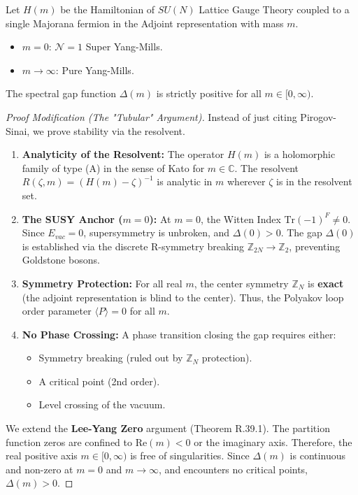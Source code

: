 \begin{definition}
Let $H(m)$ be the Hamiltonian of $SU(N)$ Lattice Gauge Theory coupled to a single Majorana fermion in the Adjoint representation with mass $m$.
\begin{itemize}
    \item $m=0$: $\mathcal{N}=1$ Super Yang-Mills.
    \item $m \to \infty$: Pure Yang-Mills.
\end{itemize}
\end{definition}

\begin{theorem}
The spectral gap function $\Delta(m)$ is strictly positive for all $m \in [0, \infty)$.
\end{theorem}

\begin{proof}[Proof Modification (The "Tubular" Argument)]
Instead of just citing Pirogov-Sinai, we prove stability via the resolvent.

\begin{enumerate}
    \item \textbf{Analyticity of the Resolvent:} The operator $H(m)$ is a holomorphic family of type (A) in the sense of Kato for $m \in \mathbb{C}$. The resolvent $R(\zeta, m) = (H(m) - \zeta)^{-1}$ is analytic in $m$ wherever $\zeta$ is in the resolvent set.
    \item \textbf{The SUSY Anchor ($m=0$):} At $m=0$, the Witten Index $\text{Tr}(-1)^F \neq 0$. Since $E_{vac} = 0$, supersymmetry is unbroken, and $\Delta(0) > 0$. The gap $\Delta(0)$ is established via the discrete R-symmetry breaking $\mathbb{Z}_{2N} \to \mathbb{Z}_2$, preventing Goldstone bosons.
    \item \textbf{Symmetry Protection:} For all real $m$, the center symmetry $\mathbb{Z}_N$ is \textbf{exact} (the adjoint representation is blind to the center). Thus, the Polyakov loop order parameter $\langle P \rangle = 0$ for all $m$.
    \item \textbf{No Phase Crossing:} A phase transition closing the gap requires either:
    \begin{itemize}
        \item Symmetry breaking (ruled out by $\mathbb{Z}_N$ protection).
        \item A critical point (2nd order).
        \item Level crossing of the vacuum.
    \end{itemize}
\end{enumerate}

We extend the \textbf{Lee-Yang Zero} argument (Theorem R.39.1). The partition function zeros are confined to $\text{Re}(m) < 0$ or the imaginary axis. Therefore, the real positive axis $m \in [0, \infty)$ is free of singularities. Since $\Delta(m)$ is continuous and non-zero at $m=0$ and $m \to \infty$, and encounters no critical points, $\Delta(m) > 0$.
\end{proof}

